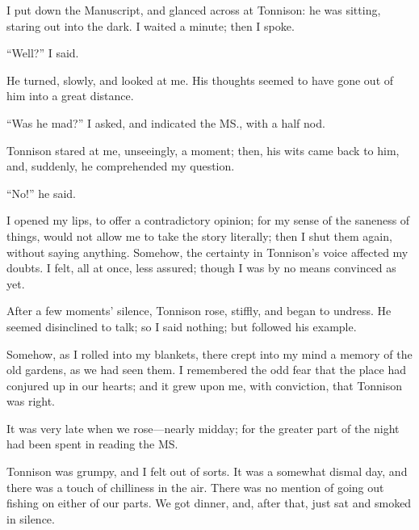 
\cleartorecto %
\label{ch:conclusion}

\begin{ChapterStart}
\null\null
{}
\null
{}
\end{ChapterStart}

I put down the Manuscript, and glanced across at Tonnison: he was sitting, staring out into the dark. I waited a minute; then I spoke.

“Well?” I said.

He turned, slowly, and looked at me. His thoughts seemed to have gone out of him into a great distance.

“Was he mad?” I asked, and indicated the MS., with a half nod.

Tonnison stared at me, unseeingly, a moment; then, his wits came back to him, and, suddenly, he comprehended my question.

“No!” he said.

I opened my lips, to offer a contradictory opinion; for my sense of the saneness of things, would not allow me to take the story literally; then I shut them again, without saying anything. Somehow, the certainty in Tonnison’s voice affected my doubts. I felt, all at once, less assured; though I was by no means convinced as yet.

After a few moments’ silence, Tonnison rose, stiffly, and began to undress. He seemed disinclined to talk; so I said nothing; but followed his example.

Somehow, as I rolled into my blankets, there crept into my mind a memory of the old gardens, as we had seen them. I remembered the odd fear that the place had conjured up in our hearts; and it grew upon me, with conviction, that Tonnison was right.

It was very late when we rose---nearly midday; for the greater part of the night had been spent in reading the MS.

Tonnison was grumpy, and I felt out of sorts. It was a somewhat dismal day, and there was a touch of chilliness in the air. There was no mention of going out fishing on either of our parts. We got dinner, and, after that, just sat and smoked in silence.

